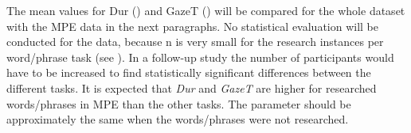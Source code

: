 \documentclass[output=paper]{langsci/langscibook}
\begin{document}
The mean values for Dur () and GazeT () will be compared for the whole dataset with the MPE data in the next paragraphs. No statistical evaluation will be conducted for the data, because n is very small for the research instances per word/phrase task (see ). In a follow-up study the number of participants would have to be increased to find statistically significant differences between the different tasks. It is expected that \textit{Dur }and\textit{ GazeT }are higher for researched words/phrases in MPE than the other tasks. The parameter should be approximately the same when the words/phrases were not researched.

\end{document}
